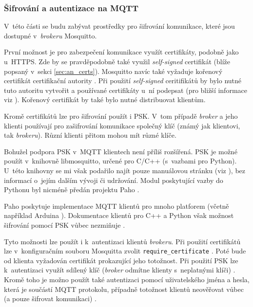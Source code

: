 \subsubsection{Šifrování a autentizace na MQTT}

V~této části se budu zabývat prostředky pro šifrování komunikace, které jsou dostupné v~\textit{brokeru} Mosquitto.

První možnost je pro zabezpečení komunikace využít certifikáty, podobně jako u~HTTPS. Zde by se pravděpodobně také využil \textit{self-signed} certifikát (blíže popsaný v~sekci \ref{sec:an_certs}). Mosquitto navíc také vyžaduje kořenový certifikát certifikační autority \cite{mqtt_mosquitto_tsl}. Při použití \textit{self-signed} ceritifikátů by bylo nutné tuto autoritu vytvořit a používané certifikáty u~ní podepsat (pro bližší informace viz \cite{ca_nguyen}). Kořenový certifikát by také bylo nutné distribuovat klientům.

Kromě certifikátů lze pro šifrování použít i PSK. V~tom případě \textit{broker} a jeho klienti používají pro zašifrování komunikace společný klíč (známý jak klientovi, tak \textit{brokeru}). Různí klienti přitom mohou mít různé klíče. \cite{mqtt_mosquitto_conf}

Bohužel podpora PSK v~MQTT klientech není příliš rozšířená. PSK je možné použít v~knihovně libmosquitto, určené pro C/C++ (s~vazbami pro Python). U~této knihovny se mi však podařilo najít pouze manuálovou stránku (viz \cite{libmosquitto_man}), bez informací o~jejím dalším vývoji či udržování. Modul poskytující vazby do Pythonu byl nicméně předán projektu Paho \cite{mosquitto_python}.

Paho poskytuje implementace MQTT klientů pro mnoho platforem (včetně například Arduina \cite{paho_embedded}). Dokumentace klientů pro C++ a Python však možnost šifrování pomocí PSK vůbec nezmiňuje \cite{paho_cpp_doc, paho_pyt_doc}.

Tyto možnosti lze použít i k~autentizaci klientů \textit{brokeru}. Při použití certifikátů lze v~konfiguračním souboru Mosquitta zvolit \verb|require_certificate| \cite{mqtt_mosquitto_conf}. Poté bude od klienta vyžadován certifikát prokazující jeho totožnost. Při použití PSK lze k~autentizaci využít sdílený klíč (\textit{broker} odmítne klienty s~neplatnými klíči) \cite{mqtt_mosquitto_conf}. Kromě toho je možno použít také autentizaci pomocí uživatelského jména a hesla, která je součástí MQTT protokolu, případně totožnost klientů neověřovat vůbec (a pouze šifrovat komunikaci) \cite{mqtt_mosquitto_conf}.

